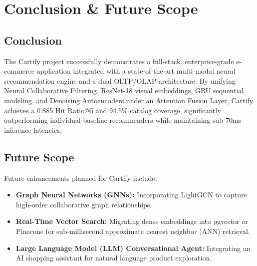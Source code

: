 \documentclass[12pt,a4paper,oneside]{report}
\begin{document}
\chapter{Conclusion \& Future Scope}

\section{Conclusion}
The Cartify project successfully demonstrates a full-stack, enterprise-grade e-commerce application integrated with a state-of-the-art multi-modal neural recommendation engine and a dual OLTP/OLAP architecture. By unifying Neural Collaborative Filtering, ResNet-18 visual embeddings, GRU sequential modeling, and Denoising Autoencoders under an Attention Fusion Layer, Cartify achieves a 0.885 Hit Ratio@5 and 94.5\% catalog coverage, significantly outperforming individual baseline recommenders while maintaining sub-70ms inference latencies.

\section{Future Scope}
Future enhancements planned for Cartify include:
\begin{itemize}
    \item \textbf{Graph Neural Networks (GNNs):} Incorporating LightGCN to capture high-order collaborative graph relationships.
    \item \textbf{Real-Time Vector Search:} Migrating dense embeddings into pgvector or Pinecone for sub-millisecond approximate nearest neighbor (ANN) retrieval.
    \item \textbf{Large Language Model (LLM) Conversational Agent:} Integrating an AI shopping assistant for natural language product exploration.
\end{itemize}
\end{document}
